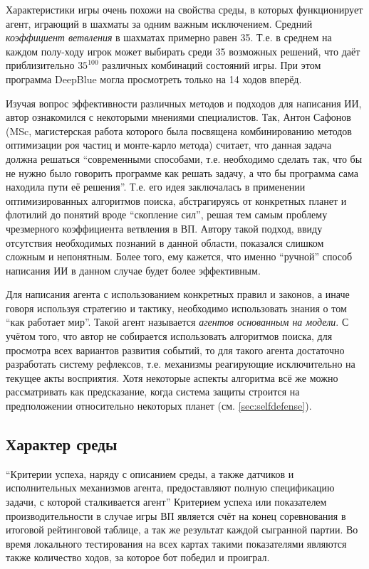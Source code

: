 \documentclass[12pt]{report}
\begin{document}
Характеристики игры очень похожи на свойства среды, в которых функционирует агент, играющий в шахматы за одним важным исключением. Средний \emph{коэффициент ветвления} в шахматах примерно равен 35. Т.е. в среднем на каждом полу-ходу игрок может выбирать среди 35 возможных решений, что даёт приблизительно $35^{100}$ различных комбинаций состояний игры. \citep{russell1995} При этом программа DeepBlue могла просмотреть только на 14 ходов вперёд. 

Изучая вопрос эффективности различных методов и подходов для написания ИИ, автор ознакомился с некоторыми мнениями специалистов. Так, Антон Сафонов (MSc, магистерская работа которого была посвящена комбинированию методов оптимизации роя частиц и монте-карло метода) считает, что данная задача должна решаться ``современными способами, т.е. необходимо сделать так, что бы не нужно было говорить программе как решать задачу, а что бы программа сама находила пути её решения''. Т.е. его идея заключалась в применении оптимизированных алгоритмов поиска, абстрагируясь от конкретных планет и флотилий до понятий вроде ``скопление сил'', решая тем самым проблему чрезмерного коэффициента ветвления в ВП. Автору такой подход, ввиду отсутствия необходимых познаний в данной области, показался слишком сложным и непонятным. Более того, ему кажется, что именно ``ручной'' способ написания ИИ в данном случае будет более эффективным.

Для написания агента с использованием конкретных правил и законов, а иначе говоря используя стратегию и тактику, необходимо использовать знания о том ``как работает мир''. Такой агент называется \emph{агентов основанным на модели}. \citep{russell1995} С учётом того, что автор не собирается использовать алгоритмов поиска, для просмотра всех вариантов развития событий, то для такого агента достаточно разработать систему рефлексов, т.е. механизмы реагирующие исключительно на текущее акты восприятия. Хотя некоторые аспекты алгоритма всё же можно рассматривать как предсказание, когда система защиты строится на предположении относительно некоторых планет (см. \ref{sec:selfdefense}).



\subsection{Характер среды}
``Критерии успеха, наряду с описанием среды, а также датчиков и исполнительных механизмов агента, предоставляют полную спецификацию задачи, с которой сталкивается агент'' \citep{russell1995} Критерием успеха или показателем производительности в случае игры ВП является счёт на конец соревнования в итоговой рейтинговой таблице, а так же результат каждой сыгранной партии. Во время локального тестирования на всех картах такими показателями являются также количество ходов, за которое бот победил и проиграл.
\end{document}
